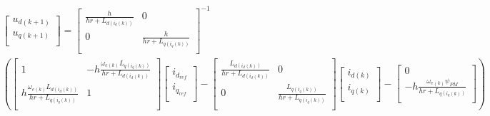 \begin{equation}
	\begin{aligned}
		\begin{bmatrix}
			u_{d(k+1)} \\
			u_{q(k+1)} \\
		\end{bmatrix}
		=
		\begin{bmatrix}
			\frac{h}{hr+L_{d(i_d(k))}} & 0                          \\
			0                          & \frac{h}{hr+L_{q(i_q(k))}} \\
		\end{bmatrix}^{-1} \\
		\left(
		\begin{bmatrix}
				1                                                    & -h\frac{\omega_{e(k)}L_{q(i_q(k))}}{hr+L_{d(i_d(k))}} \\
				h\frac{\omega_{e(k)}L_{d(i_d(k))}}{hr+L_{q(i_q(k))}} & 1                                                     \\
			\end{bmatrix}
		\begin{bmatrix}
				i_{d_{ref}} \\
				i_{q_{ref}} \\
			\end{bmatrix}
		-
		\begin{bmatrix}
				\frac{L_{d(i_d(k))}}{hr+L_{d(i_d(k))}} & 0                                      \\
				0                                      & \frac{L_{q(i_q(k))}}{hr+L_{q(i_q(k))}} \\
			\end{bmatrix}
		\begin{bmatrix}
				i_{d(k)} \\
				i_{q(k)} \\
			\end{bmatrix}
		-
		\begin{bmatrix}
				0                                                 \\
				-h\frac{\omega_{e(k)}\psi_{PM}}{hr+L_{q(i_q(k))}} \\
			\end{bmatrix}
		\right)
	\end{aligned}
	\label{eq:Vdq}
\end{equation}

